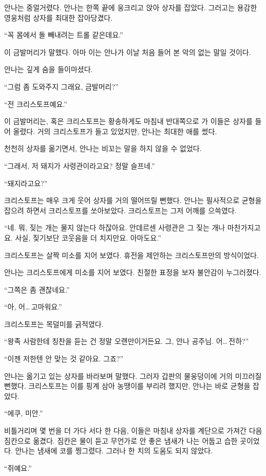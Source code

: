 안나는 중얼거렸다. 안나는 한쪽 끝에 웅크리고 앉아 상자를 잡았다. 그러고는 용감한 영웅처럼 상자를 최대한 잡아당겼다.

``꼭 몸에서 돌 빼내려는 트롤 같은데요.''

이 금발머리가 말했다. 아마 이는 안나가 이날 처음 들어 본 악의 없는 말일 것이다.

안나는 깊게 숨을 들이마셨다.

``그럼 좀 도와주지 그래요, 금발머리?''

``전 크리스토프예요.''

이 금발머리는, 혹은 크리스토프는 황송하게도 마침내 반대쪽으로 가 이들은 상자를 들어 올렸다. 거의 크리스토프가 들고 있었지만, 안나는 최대한 애를 썼다.

천천히 상자를 옮기면서, 안나는 비꼬는 말을 하지 않을 수 없었다.

``그래서, 저 돼지가 사령관이라고요? 정말 슬프네.''

``돼지라고요?''

크리스토프는 매우 크게 웃어 상자를 거의 떨어뜨릴 뻔했다. 안나는 필사적으로 균형을 잡으려 하면서 크리스토프를 쏘아보았다. 크리스토프는 그저 어깨를 으쓱였다.

``네. 뭐, 짖는 개는 물지 않는다 하잖아요. 안데르센 사령관은 그 짖는 개나 마찬가지고요. 사실, 짖기보단 코웃음을 더 치지만요. 아마도요.''

크리스토프는 살짝 미소를 지어 보였다. 휴전을 제안하는 크리스토프만의 방식이었다.

안나는 크리스토프에게 미소를 지어 보였다. 친절한 표정을 보자 불안감이 누그러졌다.

``그쪽은 좀 괜찮네요.''

``아, 어\ldots\,고마워요.''

크리스토프는 목덜미를 긁적였다.

``왕족 사람한테 칭찬을 듣는 건 정말 오랜만이거든요. 그, 안나 공주님. 어\ldots\,전하?''

``이젠 저한텐 안 맞는 것 같아요. 그죠?''

안나는 옮기고 있는 상자를 바라보며 말했다. 그러자 갑판의 물웅덩이에 거의 미끄러질 뻔했다. 크리스토프는 이를 핑계 삼아 농땡이를 부리려 했지만, 안나는 바로 균형을 잡았다.

``에쿠, 미안.''

비틀거리며 몇 번을 더 가다 서다 한 다음, 이들은 마침내 상자를 계단으로 가져간 다음 짐칸으로 옮겼다. 짐칸은 물이 듣고 무언가로 안 좋은 냄새가 나는 어둡고 습한 곳이었다. 안나는 냄새에 코를 찡그렸다. 그러나 한 치의 도움도 되지 않았다.

``쥐예요.''

